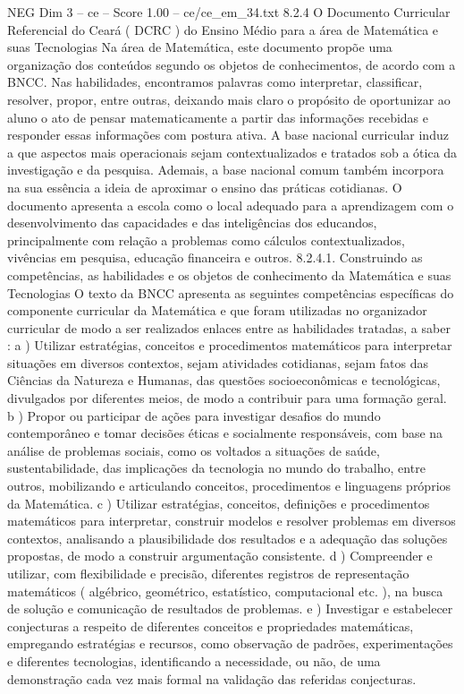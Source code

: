 \begin{textsample}{NEG Dim 3 – ce – Score 1.00 – ce/ce\_em\_34.txt}  \label{ex:f3_neg_235}
8.2.4 O Documento Curricular Referencial do Ceará ( DCRC ) do Ensino Médio para a área de Matemática e suas Tecnologias Na área de Matemática, este documento propõe uma organização dos conteúdos segundo os objetos de conhecimentos, de acordo com a BNCC.
Nas habilidades, encontramos palavras como interpretar, classificar, resolver, propor, entre outras, deixando mais claro o propósito de oportunizar ao aluno o ato de pensar matematicamente a partir das informações recebidas e responder essas informações com postura ativa.
A base nacional curricular induz a que aspectos mais operacionais sejam contextualizados e tratados sob a ótica da investigação e da pesquisa.
Ademais, a base nacional comum também incorpora na sua essência a ideia de aproximar o ensino das práticas cotidianas.
O documento apresenta a escola como o local adequado para a aprendizagem com o desenvolvimento das capacidades e das inteligências dos educandos, principalmente com relação a problemas como cálculos contextualizados, vivências em pesquisa, educação financeira e outros. 8.2.4.1.
Construindo as competências, as habilidades e os objetos de conhecimento da Matemática e suas Tecnologias O texto da BNCC apresenta as seguintes competências específicas do componente curricular da Matemática e que foram utilizadas no organizador curricular de modo a ser realizados enlaces entre as habilidades tratadas, a saber : a ) Utilizar estratégias, conceitos e procedimentos matemáticos para interpretar situações em diversos contextos, sejam atividades cotidianas, sejam fatos das Ciências da Natureza e Humanas, das questões socioeconômicas e tecnológicas, divulgados por diferentes meios, de modo a contribuir para uma formação geral. b ) Propor ou participar de ações para investigar desafios do mundo contemporâneo e tomar decisões éticas e socialmente responsáveis, com base na análise de problemas sociais, como os voltados a situações de saúde, sustentabilidade, das implicações da tecnologia no mundo do trabalho, entre outros, mobilizando e articulando conceitos, procedimentos e linguagens próprios da Matemática. c ) Utilizar estratégias, conceitos, definições e procedimentos matemáticos para interpretar, construir modelos e resolver problemas em diversos contextos, analisando a plausibilidade dos resultados e a adequação das soluções propostas, de modo a construir argumentação consistente. d ) Compreender e utilizar, com flexibilidade e precisão, diferentes registros de representação matemáticos ( algébrico, geométrico, estatístico, computacional etc. ), na busca de solução e comunicação de resultados de problemas. e ) Investigar e estabelecer conjecturas a respeito de diferentes conceitos e propriedades matemáticas, empregando estratégias e recursos, como observação de padrões, experimentações e diferentes tecnologias, identificando a necessidade, ou não, de uma demonstração cada vez mais formal na validação das referidas conjecturas.

\end{textsample}
